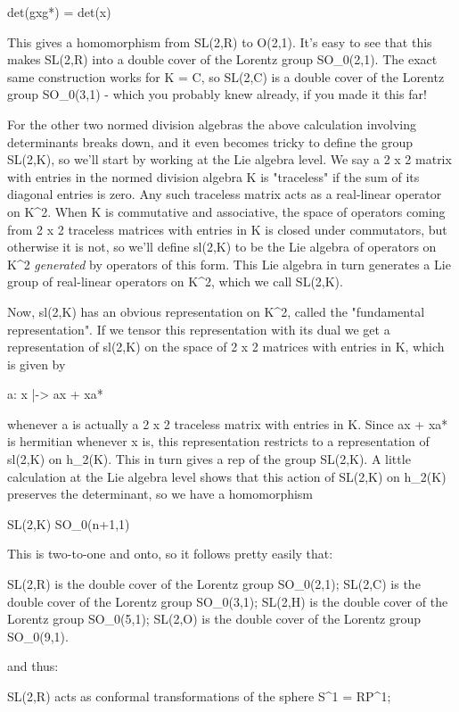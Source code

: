 det(gxg*) = det(x)

This gives a homomorphism from SL(2,R) to O(2,1).  It's easy to see that
this makes SL(2,R) into a double cover of the Lorentz group
SO_{0}(2,1). The exact same construction works for K = C, so
SL(2,C) is a double cover of the Lorentz group SO_{0}(3,1) -
which you probably knew already, if you made it this far!

For the other two normed division algebras the above calculation
involving determinants breaks down, and it even becomes tricky to define
the group SL(2,K), so we'll start by working at the Lie algebra level.
We say a 2 x 2 matrix with entries in the normed division algebra K is
"traceless" if the sum of its diagonal entries is zero.  Any
such traceless matrix acts as a real-linear operator on K^{2}.
When K is commutative and associative, the space of operators coming
from 2 x 2 traceless matrices with entries in K is closed under
commutators, but otherwise it is not, so we'll define sl(2,K) to be the
Lie algebra of operators on K^{2} \emph{generated} by
operators of this form.  This Lie algebra in turn generates a Lie group
of real-linear operators on K^{2}, which we call SL(2,K).

Now, sl(2,K) has an obvious representation on K^{2}, called the
"fundamental representation".  If we tensor this
representation with its dual we get a representation of sl(2,K) on the
space of 2 x 2 matrices with entries in K, which is given by

a: x |-> ax + xa*         

whenever a is actually a 2 x 2 traceless matrix with entries in K.
Since ax + xa* is hermitian whenever x is, this representation restricts
to a representation of sl(2,K) on h_{2}(K).  This in turn gives
a rep of the group SL(2,K).  A little calculation at the Lie algebra
level shows that this action of SL(2,K) on h_{2}(K) preserves
the determinant, so we have a homomorphism

SL(2,K) \to  SO_{0}(n+1,1)  

This is two-to-one and onto, so it follows pretty easily that:

SL(2,R) is the double cover of the Lorentz group SO_{0}(2,1);   
SL(2,C) is the double cover of the Lorentz group SO_{0}(3,1);  
SL(2,H) is the double cover of the Lorentz group SO_{0}(5,1); 
SL(2,O) is the double cover of the Lorentz group SO_{0}(9,1).

and thus:

SL(2,R) acts as conformal transformations of the sphere S^{1} = RP^{1};


